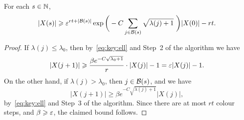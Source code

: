 \begin{lemma}
  \label{lem:X:lower:bound} %
  For each \(s \in \mathbb{N}\), 
  \begin{equation}\label{eq:X:lower:bound}
    |X(s)| \geqslant \varepsilon^{rt + |\mathcal{B}(s)|} \exp\bigg( - C \sum_{j \in \mathcal{B}(s)} \sqrt{\lambda(j)+1}\,\, \bigg) |X(0)| - rt.
  \end{equation}
\end{lemma}
%
\begin{proof}
  If \(\lambda(j) \le \lambda_0\), then by~\eqref{eq:key:ell} and Step~2 of the algorithm we have
  \begin{equation*}
    |X(j+1)| \geqslant \frac{\beta e^{- C \sqrt{\lambda_0 + 1}}}{r} \cdot |X(j)| - 1 = \varepsilon |X(j)| - 1.
  \end{equation*}
  On the other hand, if \(\lambda(j) > \lambda_0\), then \(j \in \mathcal{B}(s)\), and we have 
  \begin{equation*}
    |X(j+1)| \ge \beta e^{- C \sqrt{\lambda(j) + 1}} |X(j)|,
  \end{equation*}
  by~\eqref{eq:key:ell} and Step~3 of the algorithm. Since there are at most \(rt\) colour steps, and \(\beta \geqslant \varepsilon\), the claimed bound follows.
\end{proof}

